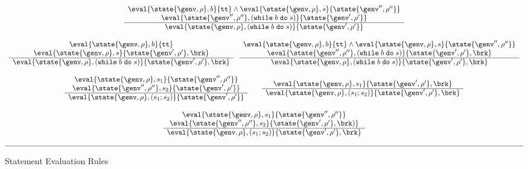 \begin{figure}[tbp]
\begin{displaymath}
\begin{array}{c}
\begin{array}{c}
\eval{\state{\genv,\rho},b}{\texttt{tt}} \wedge \eval{\state{\genv,\rho},s}{\state{\genv'',\rho''}}  \\
 \eval{\state{\genv'',\rho''},{(\texttt{while}\;b\;\texttt{do}\;s)}}{\state{\genv',\rho'}} \\
\hline
\eval{\state{\genv,\rho},{(\texttt{while}\;b\;\texttt{do}\;s)}}{\state{\genv',\rho'}}
\end{array} \\ 
\ \\
\begin{array}{c}
\eval{\state{\genv,\rho},b}{\texttt{tt}} \\
 \eval{\state{\genv,\rho},s}{\state{\genv',\rho'},\brk}  \\
\hline
\eval{\state{\genv,\rho},{(\texttt{while}\;b\;\texttt{do}\;s)}}{\state{\genv',\rho'},\brk}
\end{array}
\;\;\;
% 
\begin{array}{c}
\eval{\state{\genv,\rho},b}{\texttt{tt}} \wedge \eval{\state{\genv,\rho},s}{\state{\genv'',\rho''}}  \\
\eval{\state{\genv'',\rho''},{(\texttt{while}\;b\;\texttt{do}\;s)}}{\state{\genv',\rho'},\brk} \\
\hline
\eval{\state{\genv,\rho},{(\texttt{while}\;b\;\texttt{do}\;s)}}{\state{\genv',\rho'},\brk}
\end{array} \\ 
\ \\
\begin{array}{c}
\eval{\state{\genv,\rho},s_1}{\state{\genv'',\rho''}}    \\
\eval{\state{\genv'',\rho''},s_2}{\state{\genv',\rho'}} \\
\hline
\eval{\state{\genv,\rho},{(s_1;s_2)}}{\state{\genv',\rho'}}
\end{array} 
\;\;\;\;\;\;\;
\begin{array}{c}
\eval{\state{\genv,\rho},s_1}{\state{\genv',\rho'},\brk}   \\
\hline
\eval{\state{\genv,\rho},{(s_1;s_2)}}{\state{\genv',\rho'},\brk}
\end{array} \\
\ \\
\begin{array}{c}
\eval{\state{\genv,\rho},s_1}{\state{\genv'',\rho''}} \\
 \eval{\state{\genv'',\rho''},s_2}{\state{\genv',\rho'},\brk)} \\
\hline
\eval{\state{\genv,\rho},{(s_1;s_2)}}{\state{\genv',\rho'},\brk}
\end{array} \\
\ \\
\hline
\end{array}
\end{displaymath}
\caption{Statement Evaluation Rules}\label{fig:bigstep-statements}
\end{figure}

